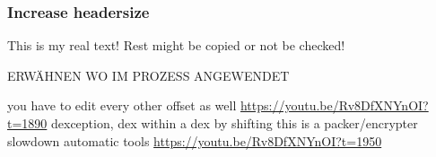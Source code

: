 \subsubsection{Increase headersize} \label{subsubsection:counter-reengineering-break-headersize}
This is my real text! Rest might be copied or not be checked!

ERWÄHNEN WO IM PROZESS ANGEWENDET\newline

you have to edit every other offset as well\newline
\url{https://youtu.be/Rv8DfXNYnOI?t=1890}\newline
dexception, dex within a dex by shifting\newline
this is a packer/encrypter\newline
slowdown automatic tools\newline
\url{https://youtu.be/Rv8DfXNYnOI?t=1950}\newline
